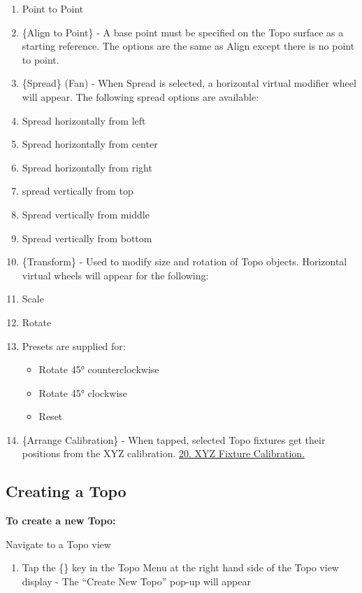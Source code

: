 \documentclass[
]{article}
\providecommand{\tightlist}{%
  \setlength{\itemsep}{0pt}\setlength{\parskip}{0pt}}
\begin{document}
\begin{enumerate}
\def\labelenumi{\arabic{enumi}.}
\setcounter{enumi}{7}
\item
  Point to Point
\item
  \{Align to Point\} - A base point must be specified on the Topo surface as a starting reference. The options are the same as Align except there is no point to point.
\item
  \{Spread\} (Fan) - When Spread is selected, a horizontal virtual modifier wheel will appear. The following spread options are available:
\item
  Spread horizontally from left
\item
  Spread horizontally from center
\item
  Spread horizontally from right
\item
  spread vertically from top
\item
  Spread vertically from middle
\item
  Spread vertically from bottom
\item
  \{Transform\} - Used to modify size and rotation of Topo objects. Horizontal virtual wheels will appear for the following:
\item
  Scale
\item
  Rotate
\item
  Presets are supplied for:

  \begin{itemize}
  \item
    Rotate 45° counterclockwise
  \item
    Rotate 45° clockwise
  \item
    Reset
  \end{itemize}
\item
  \{Arrange Calibration\} - When tapped, selected Topo fixtures get their positions from the XYZ calibration. \href{https://vibemanual.compulite.com/xyz-fixture-calibration.html}{20. XYZ Fixture Calibration.}
\end{enumerate}

\hypertarget{creating-a-topo}{%
\subsection{Creating a Topo}\label{creating-a-topo}}

\textbf{To create a new Topo:}

Navigate to a Topo view

\begin{enumerate}
\def\labelenumi{\arabic{enumi}.}
\tightlist
\item
  Tap the \{\href{image.png}{}\} key in the Topo Menu at the right hand side of the Topo view display - The ``Create New Topo'' pop-up will appear
\end{enumerate}
\end{document}
